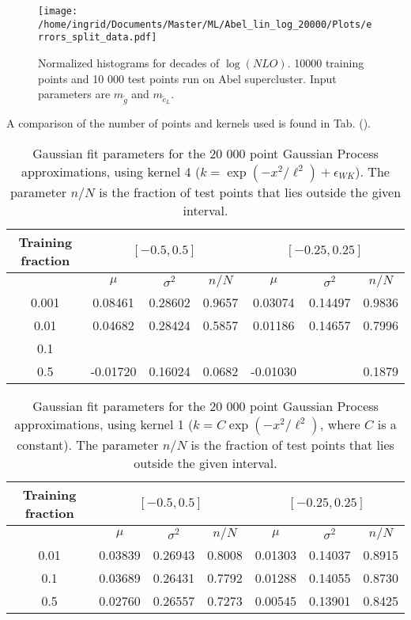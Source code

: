 \documentclass[twoside,english]{uiofysmaster}
\begin{document}
\begin{figure}[H]
\centering
\texttt{[image: /home/ingrid/Documents/Master/ML/Abel\_lin\_log\_20000/Plots/errors\_split\_data.pdf]}
\caption{Normalized histograms for decades of $\log (NLO)$. 10000 training points and 10 000 test points run on Abel supercluster. Input parameters are $m_{\tilde{g}}$ and $m_{\tilde{c}_L}$.}
\label{Fig:: Abel 20000p histograms of decades}
\end{figure}



A comparison of the number of points and kernels used is found in Tab. ().

\begin{table}
\centering
\begin{tabular}{ccccccc}
\toprule
Training fraction &  \multicolumn{3}{c}{$[-0.5, 0.5]$} & \multicolumn{3}{c}{$[-0.25,0.25]$}\\
\midrule
{}  & $\mu$ & $\sigma^2$ & $n/N$ & $\mu$ & $\sigma^2$ & $n/N$\\
0.001 & 0.08461 & 0.28602 & 0.9657 & 0.03074 & 0.14497 & 0.9836\\
0.01 & 0.04682 & 0.28424 & 0.5857 & 0.01186 & 0.14657 & 0.7996\\
0.1 \\
0.5 & -0.01720 & 0.16024 & 0.0682 & -0.01030 & \color{red}{0.10699} & 0.1879\\
\bottomrule
\end{tabular}
\caption{Gaussian fit parameters for the 20 000 point Gaussian Process approximations, using kernel 4 ($k = \exp (-x^2/\ell^2) + \epsilon_{WK}$). The parameter $n/N$ is the fraction of test points that lies outside the given interval.}
\label{Tab:: GP 20k comparison of training fractions k4}
\end{table}

\begin{table}
\centering
\begin{tabular}{ccccccc}
\toprule
Training fraction &  \multicolumn{3}{c}{$[-0.5, 0.5]$} & \multicolumn{3}{c}{$[-0.25,0.25]$}\\
\midrule
{}  & $\mu$ & $\sigma^2$ & $n/N$ & $\mu$ & $\sigma^2$ & $n/N$\\
0.01 & 0.03839 & 0.26943 & 0.8008 & 0.01303 & 0.14037 & 0.8915\\
0.1 & 0.03689 & 0.26431 & 0.7792 & 0.01288 & 0.14055 & 0.8730\\
0.5 & 0.02760 & 0.26557 & 0.7273 & 0.00545 & 0.13901 & 0.8425\\
\bottomrule
\end{tabular}
\caption{Gaussian fit parameters for the 20 000 point Gaussian Process approximations, using kernel 1 ($k = C \exp (-x^2/\ell^2)$, where $C$ is a constant). The parameter $n/N$ is the fraction of test points that lies outside the given interval.}
\label{Tab:: GP 20k comparison of training fractions k1}
\end{table}
\end{document}
